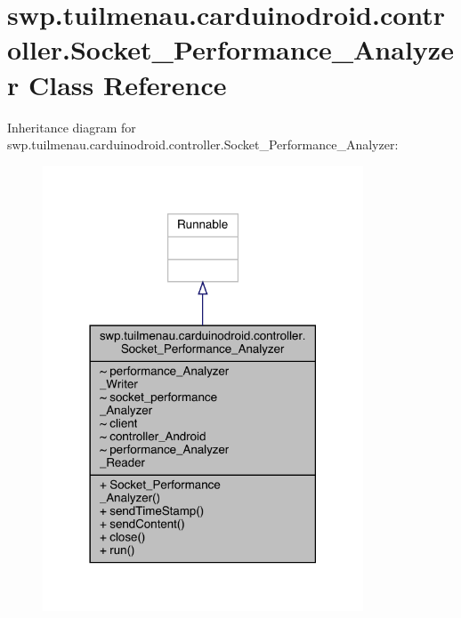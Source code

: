 \hypertarget{classswp_1_1tuilmenau_1_1carduinodroid_1_1controller_1_1_socket___performance___analyzer}{}\section{swp.\+tuilmenau.\+carduinodroid.\+controller.\+Socket\+\_\+\+Performance\+\_\+\+Analyzer Class Reference}
\label{classswp_1_1tuilmenau_1_1carduinodroid_1_1controller_1_1_socket___performance___analyzer}


Inheritance diagram for swp.\+tuilmenau.\+carduinodroid.\+controller.\+Socket\+\_\+\+Performance\+\_\+\+Analyzer\+:
\nopagebreak
\begin{figure}[H]
\begin{center}
\leavevmode
\includegraphics[width=270pt]{classswp_1_1tuilmenau_1_1carduinodroid_1_1controller_1_1_socket___performance___analyzer__inherit__graph}
\end{center}
\end{figure}


